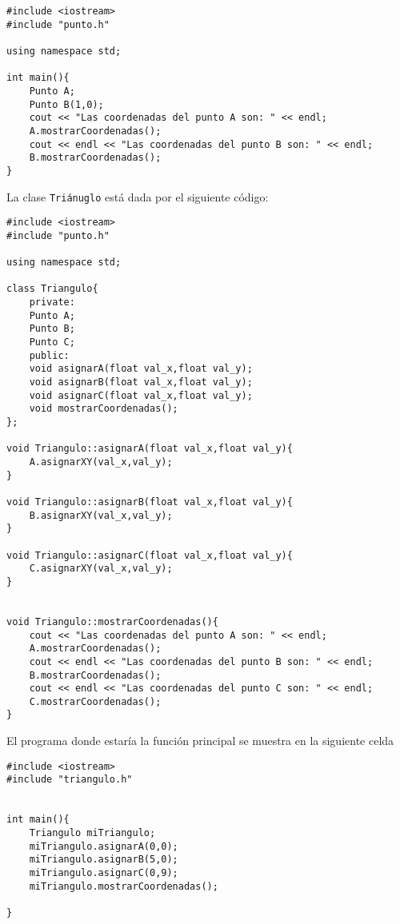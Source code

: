\documentclass[12pt]{extarticle}
\newcommand{\<}{\langle}
\renewcommand{\>}{\rangle}
\theoremstyle{definition}
\begin{document}
\begin{lstlisting}[caption={Archivo que ayuda a verificar el correcto funcionamiento de la librería punto.h},captionpos=b]
#include <iostream>
#include "punto.h"

using namespace std;

int main(){
	Punto A;
	Punto B(1,0);
	cout << "Las coordenadas del punto A son: " << endl; 
	A.mostrarCoordenadas();
	cout << endl << "Las coordenadas del punto B son: " << endl;
	B.mostrarCoordenadas();
}
\end{lstlisting}

La clase \verb|Triánuglo| está dada por el siguiente código:

\begin{lstlisting}[caption={Definición e implementación de la clase triángulo},captionpos=b]
#include <iostream>
#include "punto.h"

using namespace std;

class Triangulo{
	private:
	Punto A;
	Punto B;
	Punto C;
	public:
	void asignarA(float val_x,float val_y);
	void asignarB(float val_x,float val_y);
	void asignarC(float val_x,float val_y);
	void mostrarCoordenadas();
};

void Triangulo::asignarA(float val_x,float val_y){
	A.asignarXY(val_x,val_y);
}

void Triangulo::asignarB(float val_x,float val_y){
	B.asignarXY(val_x,val_y);
}

void Triangulo::asignarC(float val_x,float val_y){
	C.asignarXY(val_x,val_y);
}


void Triangulo::mostrarCoordenadas(){
	cout << "Las coordenadas del punto A son: " << endl;
	A.mostrarCoordenadas();
	cout << endl << "Las coordenadas del punto B son: " << endl; 
	B.mostrarCoordenadas();
	cout << endl << "Las coordenadas del punto C son: " << endl; 
	C.mostrarCoordenadas();
}
\end{lstlisting}

El programa donde estaría la función principal se muestra en la siguiente celda


\begin{lstlisting}[caption={Definición e implementación de la clase triángulo},captionpos=b]
#include <iostream>
#include "triangulo.h"


int main(){
	Triangulo miTriangulo; 
	miTriangulo.asignarA(0,0);
	miTriangulo.asignarB(5,0);
	miTriangulo.asignarC(0,9);
	miTriangulo.mostrarCoordenadas();
	
}
\end{lstlisting}
\end{document}
